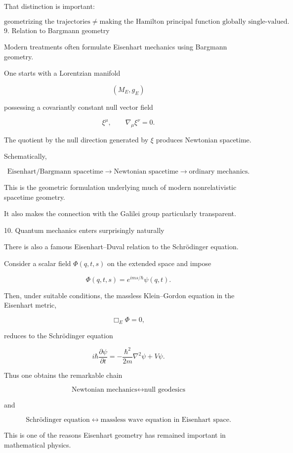 That distinction is important:

$$ \boxed{ \text{geometrizing the trajectories} \neq \text{making the Hamilton principal function globally single-valued}. } $$
9. Relation to Bargmann geometry

Modern treatments often formulate Eisenhart mechanics using Bargmann geometry.

One starts with a Lorentzian manifold

$$ (M_E,g_E) $$

possessing a covariantly constant null vector field

$$ \xi^\mu, \qquad \nabla_\mu\xi^\nu=0. $$

The quotient by the null direction generated by \(\xi\) produces Newtonian spacetime.

Schematically,

$$ \boxed{ \text{Eisenhart/Bargmann spacetime} \longrightarrow \text{Newtonian spacetime} \longrightarrow \text{ordinary mechanics}. } $$

This is the geometric formulation underlying much of modern nonrelativistic spacetime geometry.

It also makes the connection with the Galilei group particularly transparent.

10. Quantum mechanics enters surprisingly naturally

There is also a famous Eisenhart–Duval relation to the Schrödinger equation.

Consider a scalar field \(\Phi(q,t,s)\) on the extended space and impose

$$ \Phi(q,t,s) = e^{ims/\hbar}\psi(q,t). $$

Then, under suitable conditions, the massless Klein–Gordon equation in the Eisenhart metric,

$$ \Box_E\Phi=0, $$

reduces to the Schrödinger equation

$$ \boxed{ i\hbar\frac{\partial\psi}{\partial t} = -\frac{\hbar^2}{2m}\nabla^2\psi + V\psi. } $$

Thus one obtains the remarkable chain

$$ \boxed{ \text{Newtonian mechanics} \leftrightarrow \text{null geodesics} } $$

and

$$ \boxed{ \text{Schrödinger equation} \leftrightarrow \text{massless wave equation in Eisenhart space}. } $$

This is one of the reasons Eisenhart geometry has remained important in mathematical physics.

